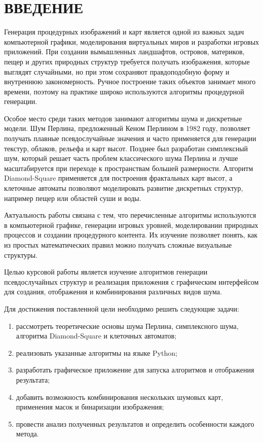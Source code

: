 \chapter*{\large ВВЕДЕНИЕ}  

Генерация процедурных изображений и карт является одной из важных задач компьютерной графики, моделирования виртуальных миров и разработки игровых приложений. При создании вымышленных ландшафтов, островов, материков, пещер и других природных структур требуется получать изображения, которые выглядят случайными, но при этом сохраняют правдоподобную форму и внутреннюю закономерность. Ручное построение таких объектов занимает много времени, поэтому на практике широко используются алгоритмы процедурной генерации.

Особое место среди таких методов занимают алгоритмы шума и дискретные модели. Шум Перлина, предложенный Кеном Перлином в 1982 году, позволяет получать плавные псевдослучайные значения и часто применяется для генерации текстур, облаков, рельефа и карт высот. Позднее был разработан симплексный шум, который решает часть проблем классического шума Перлина и лучше масштабируется при переходе к пространствам большей размерности. Алгоритм Diamond-Square применяется для построения фрактальных карт высот, а клеточные автоматы позволяют моделировать развитие дискретных структур, например пещер или областей суши и воды.

Актуальность работы связана с тем, что перечисленные алгоритмы используются в компьютерной графике, генерации игровых уровней, моделировании природных процессов и создании процедурного контента. Их изучение позволяет понять, как из простых математических правил можно получать сложные визуальные структуры.

Целью курсовой работы является изучение алгоритмов генерации псевдослучайных структур и реализация приложения с графическим интерфейсом для создания, отображения и комбинирования различных видов шума.

Для достижения поставленной цели необходимо решить следующие задачи:
\begin{enumerate}
    \item рассмотреть теоретические основы шума Перлина, симплексного шума, алгоритма Diamond-Square и клеточных автоматов;
    \item реализовать указанные алгоритмы на языке Python;
    \item разработать графическое приложение для запуска алгоритмов и отображения результата;
    \item добавить возможность комбинирования нескольких шумовых карт, применения масок и бинаризации изображения;
    \item провести анализ полученных результатов и определить особенности каждого метода.
\end{enumerate}

